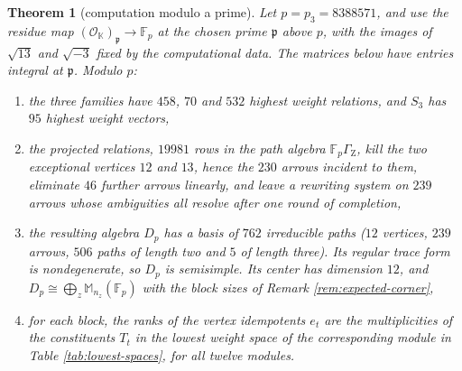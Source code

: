 \documentclass[leqno]{article}
\newcommand{\K}{\ensuremath{\mathbb{K}}}
\newcommand{\Mat}{\ensuremath{\mathbb{M}}}
\newtheorem{thm}{Theorem}[section]
\numberwithin{equation}{section}
\begin{document}
\begin{thm}[computation modulo a prime]
\label{thm:zhu-modp}
Let $p = p_3 = 8388571$, and use the residue map $(\mathcal O_{\K})_{\mathfrak p} \to \mathbb F_p$ at the chosen prime $\mathfrak p$ above $p$, with the images of $\sqrt{13}$ and $\sqrt{-3}$ fixed by the computational data. The matrices below have entries integral at $\mathfrak p$. Modulo $p$:
\begin{enumerate}
\item the three families have $458$, $70$ and $532$ highest weight relations, and $S_3$ has $95$ highest weight vectors,
\item the projected relations, $19981$ rows in the path algebra $\mathbb F_p\Gamma_{\mathrm Z}$, kill the two exceptional vertices $12$ and $13$, hence the $230$ arrows incident to them, eliminate $46$ further arrows linearly, and leave a rewriting system on $239$ arrows whose ambiguities all resolve after one round of completion,
\item the resulting algebra $D_p$ has a basis of $762$ irreducible paths ($12$ vertices, $239$ arrows, $506$ paths of length two and $5$ of length three). Its regular trace form is nondegenerate, so $D_p$ is semisimple. Its center has dimension $12$, and $D_p \cong \bigoplus_{z}\Mat_{n_z}(\mathbb F_p)$ with the block sizes of Remark \ref{rem:expected-corner},
\item for each block, the ranks of the vertex idempotents $e_t$ are the multiplicities of the constituents $T_t$ in the lowest weight space of the corresponding module in Table \ref{tab:lowest-spaces}, for all twelve modules.
\end{enumerate}
\end{thm}
\end{document}
